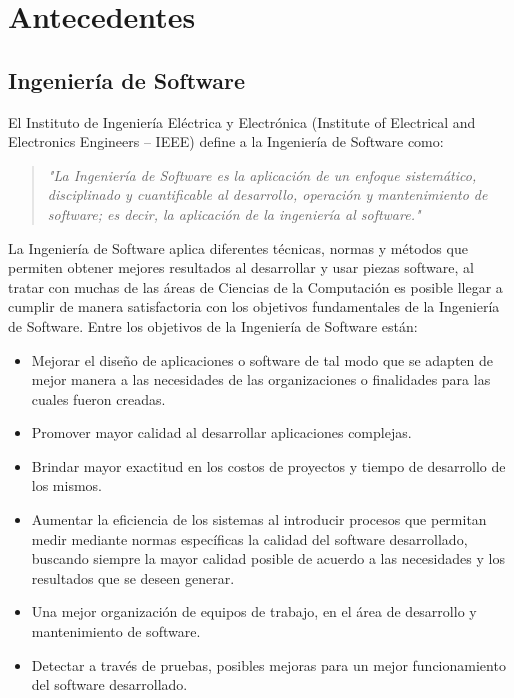 \chapter{Antecedentes}
    \label{cha:Antecedentes}

     \section{Ingeniería de Software}

 El Instituto de Ingeniería Eléctrica y Electrónica (Institute of Electrical and Electronics Engineers – IEEE) define a la Ingeniería de Software como:

\begin{quote}
\textit{"La Ingeniería de Software es la aplicación de un enfoque sistemático, disciplinado y cuantificable al desarrollo, operación y mantenimiento de software; es decir, la aplicación de la ingeniería al software.\cite{IeeeSG}"}
\end{quote}

La Ingeniería de Software aplica diferentes técnicas, normas y métodos que permiten obtener mejores resultados al desarrollar y usar piezas software, al tratar con muchas de las áreas de Ciencias de la Computación es posible llegar a cumplir de manera satisfactoria con los objetivos fundamentales de la Ingeniería de Software. Entre los objetivos de la Ingeniería de Software están\cite{enSWE}:

\begin{itemize}
\item Mejorar el diseño de aplicaciones o software de tal modo que se adapten de mejor manera a las necesidades de las organizaciones o finalidades para las cuales fueron creadas.
\item Promover mayor calidad al desarrollar aplicaciones complejas.
\item Brindar mayor exactitud en los costos de proyectos y tiempo de desarrollo de los mismos.
\item Aumentar la eficiencia de los sistemas al introducir procesos que permitan medir mediante normas específicas la calidad del software desarrollado, buscando siempre la mayor calidad posible de acuerdo a  las necesidades y los resultados que se deseen generar.
\item Una mejor organización de equipos de trabajo, en el área de desarrollo y mantenimiento de software.
\item Detectar a través de pruebas, posibles mejoras para un mejor funcionamiento del software desarrollado.
\end{itemize} 

